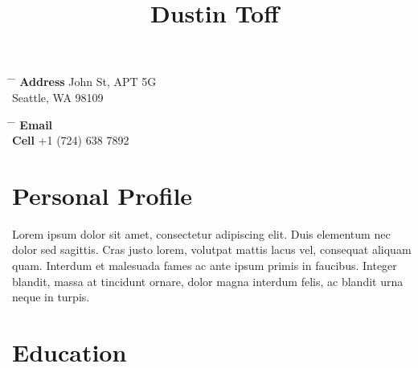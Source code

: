 %
%
%
%

\title{Dustin Toff} %


\parbox {0.5\textwidth} { %
    \begin {tabbing} %
        \hspace{3cm} \= \hspace{4cm} \= \kill %
        {\bf Address}  John St, APT 5G\\ %
        \> Seattle, WA 98109 \\ %
    \end {tabbing}

}
\hfill %
\parbox {0.5\textwidth} { %
    \begin {tabbing} %
        \hspace{3cm} \= \hspace{4cm} \= \kill %
        {\bf Email} \>  \\ %
        {\bf Cell} \> +1 (724) 638 7892 \\ %
    \end {tabbing}
}


\section {Personal Profile}

Lorem ipsum dolor sit amet, consectetur adipiscing elit. Duis elementum nec dolor sed sagittis. Cras justo lorem, volutpat mattis lacus vel, consequat aliquam quam. Interdum et malesuada fames ac ante ipsum primis in faucibus. Integer blandit, massa at tincidunt ornare, dolor magna interdum felis, ac blandit urna neque in turpis.

\section {Education}

